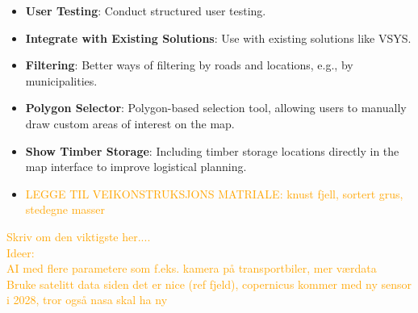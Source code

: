 \begin{itemize}
    \item \textbf{User Testing}: Conduct structured user testing.
    \item \textbf{Integrate with Existing Solutions}: Use with existing solutions like VSYS. 
    \item \textbf{Filtering}: Better ways of filtering by roads and locations, e.g., by municipalities.
    \item \textbf{Polygon Selector}: Polygon-based selection tool, allowing users to manually draw custom areas of interest on the map.
    \item \textbf{Show Timber Storage}: Including timber storage locations directly in the map interface to improve logistical planning.
    \item \textcolor{orange}{LEGGE TIL VEIKONSTRUKSJONS MATRIALE: knust fjell, sortert grus, stedegne masser}
\end{itemize}


\textcolor{orange}{
Skriv om den viktigste her.... \\
Ideer: \\ 
AI med flere parametere som f.eks. kamera på transportbiler, mer værdata \\
Bruke satelitt data siden det er nice (ref fjeld), copernicus kommer med ny sensor i 2028, tror også nasa skal ha ny \\
}
